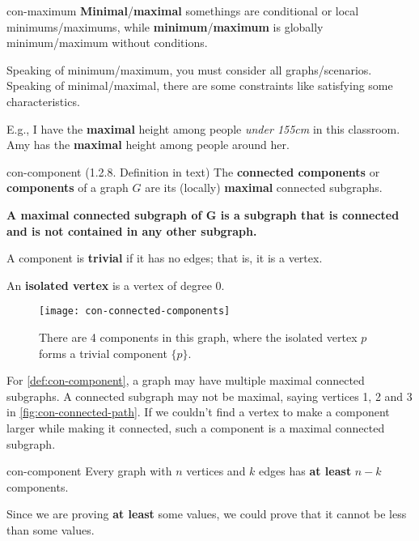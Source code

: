 \documentclass[../src/handouts/main.tex]{subfiles}
\begin{document}
\begin{remark}{}{con-maximum}
  \textbf{Minimal}/\textbf{maximal} somethings are conditional or local minimums/maximums, while \textbf{minimum}/\textbf{maximum} is globally minimum/maximum without conditions.

  Speaking of minimum/maximum, you must consider all graphs/scenarios. Speaking of minimal/maximal, there are some constraints like satisfying some characteristics.

  E.g., I have the \textbf{maximal} height among people \textit{under 155cm} in this classroom. Amy has the \textbf{maximal} height among people around her.
\end{remark}

\begin{definition}{}{con-component}
  (1.2.8. Definition in text)
  The \textbf{connected components} or \textbf{components} of a graph $G$ are its (locally) \textbf{maximal} connected subgraphs.

  \textbf{A maximal connected subgraph of $\bm{G}$ is a subgraph that is connected and is not contained in any other subgraph.}

  A component is \textbf{trivial} if it has no edges; that is, it is a vertex.

  An \textbf{isolated vertex} is a vertex of degree 0.
\end{definition}

\begin{figure}[htbp]
  \centering
  \texttt{[image: con-connected-components]}
  \caption{There are 4 components in this graph, where the isolated vertex $p$ forms a trivial component $\{p\}$.}
  \label{fig:con-component}
\end{figure}

For \cref{def:con-component}, a graph may have multiple maximal connected subgraphs. A connected subgraph may not be maximal, saying vertices 1, 2 and 3 in \cref{fig:con-connected-path}. If we couldn't find a vertex to make a component larger while making it connected, such a component is a maximal connected subgraph.

\begin{proposition}{}{con-component}
  Every graph with $n$ vertices and $k$ edges has \textbf{at least} $n - k$ components.
\end{proposition}

Since we are proving \textbf{at least} some values, we could prove that it cannot be less than some values. 
\end{document}
